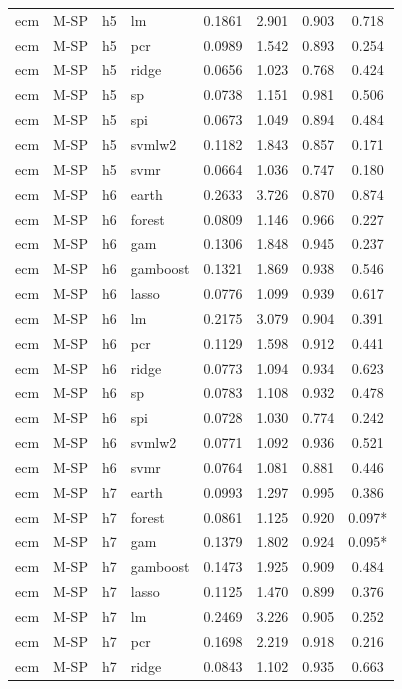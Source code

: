 \begin{ThreePartTable}
\begin{longtable}[t]{llclcccc}
ecm & M-SP & h5 & lm & 0.1861 & 2.901 & 0.903 & 0.718\\
ecm & M-SP & h5 & pcr & 0.0989 & 1.542 & 0.893 & 0.254\\
ecm & M-SP & h5 & ridge & 0.0656 & 1.023 & 0.768 & 0.424\\
ecm & M-SP & h5 & sp & 0.0738 & 1.151 & 0.981 & 0.506\\
ecm & M-SP & h5 & spi & 0.0673 & 1.049 & 0.894 & 0.484\\
ecm & M-SP & h5 & svmlw2 & 0.1182 & 1.843 & 0.857 & 0.171\\
ecm & M-SP & h5 & svmr & 0.0664 & 1.036 & 0.747 & 0.180\\
\addlinespace
ecm & M-SP & h6 & earth & 0.2633 & 3.726 & 0.870 & 0.874\\
ecm & M-SP & h6 & forest & 0.0809 & 1.146 & 0.966 & 0.227\\
ecm & M-SP & h6 & gam & 0.1306 & 1.848 & 0.945 & 0.237\\
ecm & M-SP & h6 & gamboost & 0.1321 & 1.869 & 0.938 & 0.546\\
ecm & M-SP & h6 & lasso & 0.0776 & 1.099 & 0.939 & 0.617\\
ecm & M-SP & h6 & lm & 0.2175 & 3.079 & 0.904 & 0.391\\
ecm & M-SP & h6 & pcr & 0.1129 & 1.598 & 0.912 & 0.441\\
ecm & M-SP & h6 & ridge & 0.0773 & 1.094 & 0.934 & 0.623\\
ecm & M-SP & h6 & sp & 0.0783 & 1.108 & 0.932 & 0.478\\
ecm & M-SP & h6 & spi & 0.0728 & 1.030 & 0.774 & 0.242\\
ecm & M-SP & h6 & svmlw2 & 0.0771 & 1.092 & 0.936 & 0.521\\
ecm & M-SP & h6 & svmr & 0.0764 & 1.081 & 0.881 & 0.446\\
\addlinespace
ecm & M-SP & h7 & earth & 0.0993 & 1.297 & 0.995 & 0.386\\
ecm & M-SP & h7 & forest & 0.0861 & 1.125 & 0.920 & 0.097*\\
ecm & M-SP & h7 & gam & 0.1379 & 1.802 & 0.924 & 0.095*\\
ecm & M-SP & h7 & gamboost & 0.1473 & 1.925 & 0.909 & 0.484\\
ecm & M-SP & h7 & lasso & 0.1125 & 1.470 & 0.899 & 0.376\\
ecm & M-SP & h7 & lm & 0.2469 & 3.226 & 0.905 & 0.252\\
ecm & M-SP & h7 & pcr & 0.1698 & 2.219 & 0.918 & 0.216\\
ecm & M-SP & h7 & ridge & 0.0843 & 1.102 & 0.935 & 0.663\\

\end{longtable}
\end{ThreePartTable}
